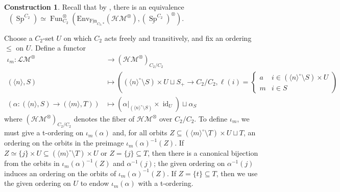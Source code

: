 \documentclass{article}
\DeclareMathOperator{\Fun}{Fun} %
\DeclareMathOperator{\id}{id} %
\DeclareMathOperator{\Modh}{{}^{\sigma}Mod} %
\DeclareMathOperator{\Spectra}{Sp} %
\newcommand{\Fin}{\mathrm{Fin}} %
\theoremstyle{definition}
\newtheorem{construction}[equation]{Construction}
\newcommand{\Lucy}[1]{\todo[color=cyan!30]{\footnotesize L: #1}}
\begin{document}
\begin{construction}\label{cons:module_with_gen_involution_in_families}    
    Recall that by \cite[Proposition 2.8.7(1)]{NS22}, there is an equivalence $ \Modh\left(\underline{\Spectra}^{C_2}\right) \simeq \Fun^\otimes_{C_2}\left(\mathrm{Env}_{\underline{\Fin}_{C_2,*}}(\mathcal{HM}^\otimes), \left(\underline{\Spectra}^{C_2}\right)^\otimes\right) $. 

    Choose a $ C_2 $-set $ U $ on which $ C_2 $ acts freely and transitively, and fix an ordering $ \leq $ on $ U $. 
    Define a functor 
    \begin{equation*}
    \begin{split}
        \iota_m \colon \mathcal{LM}^\otimes & \to \left(\mathcal{HM}^\otimes\right)_{C_2/C_2} \\
         \left(\langle n \rangle, S \right) & \mapsto \left((\langle n \rangle^\circ \setminus S) \times U \sqcup S_+ \to C_2/C_2, \ell(i) = \begin{cases}
             a & i \in (\langle n \rangle^\circ \setminus S) \times U \\
             m & i \in S 
         \end{cases} \right) \\
         \left(\alpha \colon \left(\langle n \rangle, S\right) \to \left(\langle m \rangle, T\right) \right) & \mapsto \left(\left.\alpha\right|_{(\langle n \rangle^\circ \setminus S)} \times \id_U\right) \sqcup \alpha_{S} 
    \end{split}
    \end{equation*} 
    where $ \left(\mathcal{HM}^\otimes\right)_{C_2/C_2} $ denotes the fiber of $ \mathcal{HM}^\otimes $ over $ C_2/C_2 $. 
    To define $ \iota_m $, we must give a t-ordering on $ \iota_m(\alpha) $ and, for all orbits $ Z \subseteq (\langle m \rangle^\circ \setminus T) \times U \sqcup T $, an ordering on the orbits in the preimage $ \iota_m(\alpha)^{-1}(Z) $. 
    If $ Z \simeq \{j\} \times U \subseteq (\langle m \rangle^\circ \setminus T) \times U $ or $ Z = \{j\} \subseteq T $, then there is a canonical bijection from the orbits in $ \iota_m(\alpha)^{-1}(Z) $ and $ \alpha^{-1}(j) $; the given ordering on $ \alpha^{-1}(j) $ induces an ordering on the orbits of $ \iota_m(\alpha)^{-1}(Z) $. 
    If $ Z = \{t\} \subseteq T $, then we use the given ordering on $ U $ to endow $ \iota_m(\alpha) $ with a t-ordering. 


\end{construction}
\end{document}
